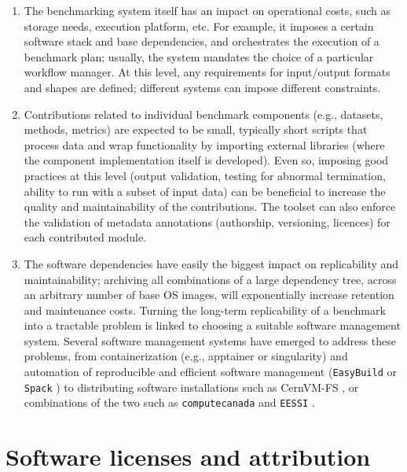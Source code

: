 \documentclass[11pt]{article}
\begin{document}
\begin{enumerate}
\item The benchmarking system itself has an impact on operational costs, such as storage needs, execution platform, etc. For example, it imposes a certain software stack and base dependencies, and orchestrates the execution of a benchmark plan; usually, the system mandates the choice of a particular workflow manager. At this level, any requirements for input/output formats and shapes are defined; different systems can impose different constraints.

\item Contributions related to individual benchmark components (e.g., datasets, methods, metrics) are expected to be small, typically short scripts that process data and wrap functionality by importing external libraries (where the component implementation itself is developed). Even so, imposing good practices at this level (output validation, testing for abnormal termination, ability to run with a subset of input data) can be beneficial to increase the quality and maintainability of the contributions. The toolset can also enforce the validation of metadata annotations (authorship, versioning, licences) for each contributed module.

\item The software dependencies have easily the biggest impact on replicability and maintainability; archiving all combinations of a large dependency tree, across an arbitrary number of base OS images, will exponentially increase retention and maintenance costs. Turning the long-term replicability of a benchmark into a tractable problem is linked to choosing a suitable software management system. Several software management systems have emerged to address these problems, from containerization (e.g., apptainer or singularity) \cite{Kurtzer2017-mn} and automation of reproducible and efficient software management (\texttt{EasyBuild} \cite{Hoste2012-gg} or \texttt{Spack} \cite{Gamblin2015-ll}) to distributing software installations such as CernVM-FS \cite{Blomer2013-jk},  or combinations of the two such as \texttt{computecanada} \cite{Boissonneault2019-wm} and \texttt{EESSI} \cite{Droge2023-ax}.

\end{enumerate}

\section*{Software licenses and attribution}
\end{document}
